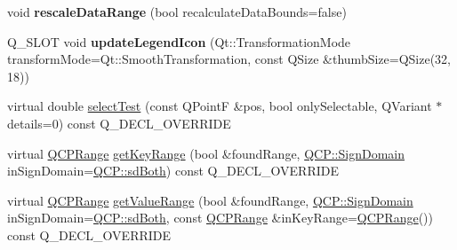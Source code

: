 \begin{DoxyCompactItemize}
\item 
void {\bfseries rescale\+Data\+Range} (bool recalculate\+Data\+Bounds=false)\hypertarget{class_q_c_p_color_map_a856608fa3dd1cc290bcd5f29a5575774}{}\label{class_q_c_p_color_map_a856608fa3dd1cc290bcd5f29a5575774}

\item 
Q\+\_\+\+S\+L\+OT void {\bfseries update\+Legend\+Icon} (Qt\+::\+Transformation\+Mode transform\+Mode=Qt\+::\+Smooth\+Transformation, const Q\+Size \&thumb\+Size=Q\+Size(32, 18))\hypertarget{class_q_c_p_color_map_a57a4fd9d9f92f7f75fcb425ffb4b8466}{}\label{class_q_c_p_color_map_a57a4fd9d9f92f7f75fcb425ffb4b8466}

\item 
virtual double \hyperlink{class_q_c_p_color_map_ada7fe6f5314d7a75377e86d3867d23f0}{select\+Test} (const Q\+PointF \&pos, bool only\+Selectable, Q\+Variant $\ast$details=0) const Q\+\_\+\+D\+E\+C\+L\+\_\+\+O\+V\+E\+R\+R\+I\+DE
\item 
virtual \hyperlink{class_q_c_p_range}{Q\+C\+P\+Range} \hyperlink{class_q_c_p_color_map_a7c87826c64551d5f2ade620f12599e45}{get\+Key\+Range} (bool \&found\+Range, \hyperlink{namespace_q_c_p_afd50e7cf431af385614987d8553ff8a9}{Q\+C\+P\+::\+Sign\+Domain} in\+Sign\+Domain=\hyperlink{namespace_q_c_p_afd50e7cf431af385614987d8553ff8a9a3dee7e9cd2fedce9253b83e172626a6c}{Q\+C\+P\+::sd\+Both}) const Q\+\_\+\+D\+E\+C\+L\+\_\+\+O\+V\+E\+R\+R\+I\+DE
\item 
virtual \hyperlink{class_q_c_p_range}{Q\+C\+P\+Range} \hyperlink{class_q_c_p_color_map_aec2db5aa68ba9625af8e0b7538faa6f2}{get\+Value\+Range} (bool \&found\+Range, \hyperlink{namespace_q_c_p_afd50e7cf431af385614987d8553ff8a9}{Q\+C\+P\+::\+Sign\+Domain} in\+Sign\+Domain=\hyperlink{namespace_q_c_p_afd50e7cf431af385614987d8553ff8a9a3dee7e9cd2fedce9253b83e172626a6c}{Q\+C\+P\+::sd\+Both}, const \hyperlink{class_q_c_p_range}{Q\+C\+P\+Range} \&in\+Key\+Range=\hyperlink{class_q_c_p_range}{Q\+C\+P\+Range}()) const Q\+\_\+\+D\+E\+C\+L\+\_\+\+O\+V\+E\+R\+R\+I\+DE
\end{DoxyCompactItemize}
